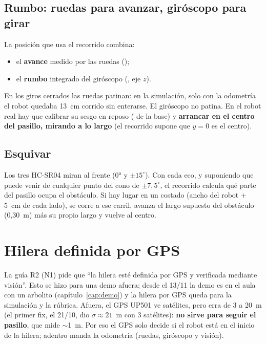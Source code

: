 \subsection{Rumbo: ruedas para avanzar, giróscopo para girar}
La posición que usa el recorrido combina:
\begin{itemize}
  \item el \textbf{avance} medido por las ruedas ();
  \item el \textbf{rumbo} integrado del giróscopo (, eje $z$).
\end{itemize}
En los giros cerrados las ruedas patinan: en la simulación, solo con la odometría el robot quedaba 13~cm corrido sin
enterarse. El giróscopo no patina. En el robot real hay que calibrar su sesgo en reposo ( de la base) y
\textbf{arrancar en el centro del pasillo, mirando a lo largo} (el recorrido supone que $y = 0$ es el centro).

\subsection{Esquivar}
Los tres HC-SR04 miran al frente (0° y $\pm 15^\circ$). Con cada eco, y suponiendo que puede venir de cualquier punto del
cono de $\pm 7{,}5^\circ$, el recorrido calcula qué parte del pasillo ocupa el obstáculo. Si hay lugar en un costado
(ancho del robot + 5~cm de cada lado), se corre a ese carril, avanza el largo supuesto del obstáculo (0,30~m) más su
propio largo y vuelve al centro.

\section{Hilera definida por GPS}\label{sec:hilera-gps}

La guía R2 (N1) pide que ``la hilera esté definida por GPS y verificada mediante visión''. Esto se hizo para una
demo afuera; desde el 13/11 la demo es en el aula con un arbolito (capítulo~\ref{cap:demo}) y la hilera por GPS queda
para la simulación y la rúbrica. Afuera, el GPS UP501 ve satélites, pero erra de 3 a 20~m (el primer fix, el 21/10, dio $\sigma \approx 21$~m con 3
satélites): \textbf{no sirve para seguir el pasillo}, que mide $\sim$1~m. Por eso el GPS solo decide si el robot está
en el inicio de la hilera; adentro manda la odometría (ruedas, giróscopo y visión).


